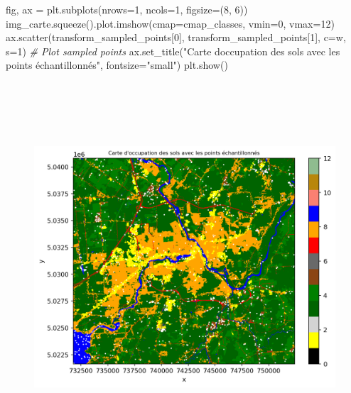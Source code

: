 \documentclass[
]{article}
\newenvironment{Shaded}{}{}
\newcommand{\CommentTok}[1]{\textcolor[rgb]{0.38,0.63,0.69}{\textit{#1}}}
\newcommand{\DecValTok}[1]{\textcolor[rgb]{0.25,0.63,0.44}{#1}}
\newcommand{\NormalTok}[1]{#1}
\newcommand{\OperatorTok}[1]{\textcolor[rgb]{0.40,0.40,0.40}{#1}}
\newcommand{\StringTok}[1]{\textcolor[rgb]{0.25,0.44,0.63}{#1}}
\begin{document}
\begin{Shaded}
\begin{Highlighting}[]
\NormalTok{fig, ax }\OperatorTok{=}\NormalTok{ plt.subplots(nrows}\OperatorTok{=}\DecValTok{1}\NormalTok{, ncols}\OperatorTok{=}\DecValTok{1}\NormalTok{, figsize}\OperatorTok{=}\NormalTok{(}\DecValTok{8}\NormalTok{, }\DecValTok{6}\NormalTok{))}
\NormalTok{img\_carte.squeeze().plot.imshow(cmap}\OperatorTok{=}\NormalTok{cmap\_classes, vmin}\OperatorTok{=}\DecValTok{0}\NormalTok{, vmax}\OperatorTok{=}\DecValTok{12}\NormalTok{)}
\NormalTok{ax.scatter(transform\_sampled\_points[}\DecValTok{0}\NormalTok{], transform\_sampled\_points[}\DecValTok{1}\NormalTok{], c}\OperatorTok{=}\StringTok{\textquotesingle{}w\textquotesingle{}}\NormalTok{, s}\OperatorTok{=}\DecValTok{1}\NormalTok{)  }\CommentTok{\# Plot sampled points}
\NormalTok{ax.set\_title(}\StringTok{"Carte d\textquotesingle{}occupation des sols avec les points échantillonnés"}\NormalTok{, fontsize}\OperatorTok{=}\StringTok{"small"}\NormalTok{)}
\NormalTok{plt.show()}
\end{Highlighting}
\end{Shaded}

\begin{figure}
\centering
\includegraphics[width=6.75in,height=5.41667in]{05-ClassificationsSupervisees_files/figure-html/cell-11-output-1.png}
\caption{}
\end{figure}
\end{document}
